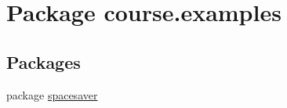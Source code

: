 \hypertarget{namespacecourse_1_1examples}{}\section{Package course.\+examples}
\label{namespacecourse_1_1examples}
\subsection*{Packages}
\begin{DoxyCompactItemize}
\item 
package \hyperlink{namespacecourse_1_1examples_1_1spacesaver}{spacesaver}
\end{DoxyCompactItemize}
